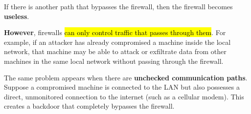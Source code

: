 \documentclass{article}
\begin{document}
If there is another path that bypasses the firewall, then the firewall
becomes \textbf{useless}.

\textbf{However}, firewalls \hl{can only control traffic that passes through
them}. For example, if an attacker has already compromised a
machine inside the local network, that machine may be able to attack or
exfiltrate data from other machines in the same local network without
passing through the firewall.

The same problem appears when there are \textbf{unchecked communication
paths}. Suppose a compromised machine is connected to the LAN but also possesses a direct, unmonitored connection to the internet (such as a cellular modem). This creates a backdoor that completely bypasses the firewall.
\end{document}
